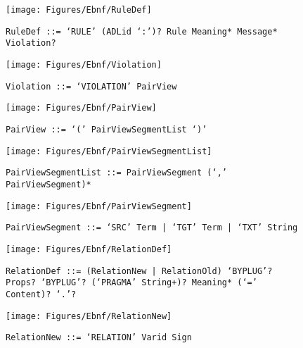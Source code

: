  \begin{figure}[H]
  \centering
  \texttt{[image: Figures/Ebnf/RuleDef]}
  \caption*{\texttt{RuleDef \small::=  `RULE' (ADLid `:')? Rule Meaning* Message* Violation?}}
  \label{fig:ebnf-RuleDef}
 \end{figure}

 \begin{figure}[H]
  \centering
  \texttt{[image: Figures/Ebnf/Violation]}
  \caption*{\texttt{Violation \small::=  `VIOLATION' PairView}}
  \label{fig:ebnf-Violation}
 \end{figure}

 \begin{figure}[H]
  \centering
  \texttt{[image: Figures/Ebnf/PairView]}
  \caption*{\texttt{PairView \small::=  `(' PairViewSegmentList `)'}}
  \label{fig:ebnf-PairView}
 \end{figure}

 \begin{figure}[H]
  \centering
  \texttt{[image: Figures/Ebnf/PairViewSegmentList]}
  \caption*{\texttt{PairViewSegmentList \small::=  PairViewSegment (`,' PairViewSegment)*}}
  \label{fig:ebnf-PairViewSegmentList}
 \end{figure}

 \begin{figure}[H]
  \centering
  \texttt{[image: Figures/Ebnf/PairViewSegment]}
  \caption*{\texttt{PairViewSegment \small::=  `SRC' Term | `TGT' Term | `TXT' String}}
  \label{fig:ebnf-PairViewSegment}
 \end{figure}

 \begin{figure}[H]
  \centering
  \texttt{[image: Figures/Ebnf/RelationDef]}
  \caption*{\texttt{RelationDef \small::=  (RelationNew | RelationOld) `BYPLUG'? Props? `BYPLUG'? (`PRAGMA' String+)? Meaning* (`=' Content)? `.'?}}
  \label{fig:ebnf-RelationDef}
 \end{figure}

 \begin{figure}[H]
  \centering
  \texttt{[image: Figures/Ebnf/RelationNew]}
  \caption*{\texttt{RelationNew \small::=  `RELATION' Varid Sign}}
  \label{fig:ebnf-RelationNew}
 \end{figure}

